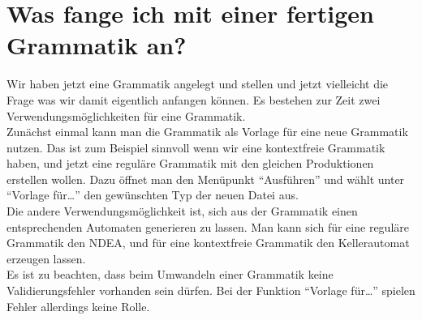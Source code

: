\section{Was fange ich mit einer fertigen Grammatik an?}

Wir haben jetzt eine Grammatik angelegt und stellen und jetzt vielleicht die
Frage was wir damit eigentlich anfangen können. Es bestehen zur Zeit zwei
Verwendungsmöglichkeiten für eine Grammatik.\\

Zunächst einmal kann man die Grammatik als Vorlage für eine neue Grammatik
nutzen. Das ist zum Beispiel sinnvoll wenn wir eine kontextfreie Grammatik
haben, und jetzt eine reguläre Grammatik mit den gleichen Produktionen
erstellen wollen. Dazu öffnet man den Menüpunkt "`Ausführen"' und wählt unter
"`Vorlage für\ldots"' den gewünschten Typ der neuen Datei aus.\\

Die andere Verwendungsmöglichkeit ist, sich aus der Grammatik einen
entsprechenden Automaten generieren zu lassen. Man kann sich für eine reguläre
Grammatik den NDEA, und für eine kontextfreie Grammatik den Kellerautomat
erzeugen lassen.\\

Es ist zu beachten, dass beim Umwandeln einer Grammatik keine
Validierungsfehler vorhanden sein dürfen. Bei der Funktion "`Vorlage
für\ldots"' spielen Fehler allerdings keine Rolle.




